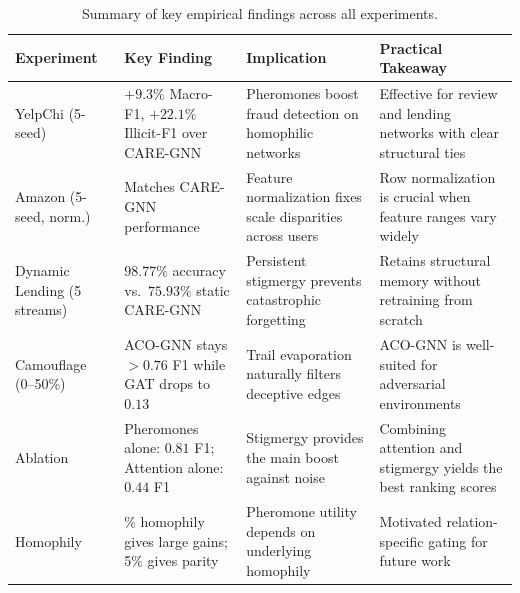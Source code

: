 \begin{table}[htbp]
\centering
\footnotesize
\setlength{\tabcolsep}{3pt}
\caption[Summary of key empirical findings]{Summary of key empirical findings across all experiments.}
\label{tab:findings_summary}
\begin{tabularx}{\textwidth}{@{} >{\raggedright\arraybackslash}p{2.6cm} >{\raggedright\arraybackslash}X >{\raggedright\arraybackslash}X >{\raggedright\arraybackslash}X @{}}
\toprule
\textbf{Experiment} & \textbf{Key Finding} & \textbf{Implication} & \textbf{Practical Takeaway} \\
\midrule
YelpChi (5-seed) & $+9.3\%$ Macro-F1, $+22.1\%$ Illicit-F1 over CARE-GNN & Pheromones boost fraud detection on homophilic networks & Effective for review and lending networks with clear structural ties \\
\midrule
Amazon (5-seed, norm.) & Matches CARE-GNN performance & Feature normalization fixes scale disparities across users & Row normalization is crucial when feature ranges vary widely \\
\midrule
Dynamic Lending (5 streams) & $98.77\%$ accuracy vs.\ $75.93\%$ static CARE-GNN & Persistent stigmergy prevents catastrophic forgetting & Retains structural memory without retraining from scratch \\
\midrule
Camouflage (0--50\%) & ACO-GNN stays $> 0.76$ F1 while GAT drops to $0.13$ & Trail evaporation naturally filters deceptive edges & ACO-GNN is well-suited for adversarial environments \\
\midrule
Ablation & Pheromones alone: $0.81$ F1; Attention alone: $0.44$ F1 & Stigmergy provides the main boost against noise & Combining attention and stigmergy yields the best ranking scores \\
\midrule
Homophily & 91\% homophily gives large gains; 5\% gives parity & Pheromone utility depends on underlying homophily & Motivated relation-specific gating for future work \\
\bottomrule
\end{tabularx}
\end{table}

